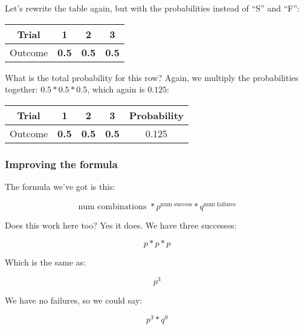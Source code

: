 \documentclass[../../../main.tex]{subfiles}
\begin{document}
Let's rewrite the table again, but with the probabilities instead of ``S'' and ``F'':

\begin{center}
  \begin{tabular}{| c | c | c | c |}
    \hline
      \textbf{Trial} & \textbf{1} & \textbf{2} & \textbf{3} \\ \hline
  Outcome & \textbf{0.5} & \textbf{0.5} & \textbf{0.5} \\ \hline
  \end{tabular}
\end{center}

\noindent
What is the total probability for this row? Again, we multiply the probabilities together: $0.5 * 0.5 * 0.5$, which again is $0.125$:

\begin{center}
  \begin{tabular}{| c | c | c | c | c |}
    \hline
      \textbf{Trial} & \textbf{1} & \textbf{2} & \textbf{3} & \textbf{Probability} \\ \hline
  Outcome & \textbf{0.5} & \textbf{0.5} & \textbf{0.5} & 0.125 \\ \hline
  \end{tabular}
\end{center}

\subsubsection{Improving the formula}

The formula we've got is this:

\begin{equation*}
    \text{num combinations } * p^{\text{num success}} * q^{\text{num failures}}
\end{equation*}

Does this work here too? Yes it does. We have three successes:

\begin{equation*}
    p * p * p
\end{equation*}

Which is the same as:

\begin{equation*}
    p^{3}
\end{equation*}

We have no failures, so we could say:

\begin{equation*}
    p^{3} * q^{0}
\end{equation*}
\end{document}
